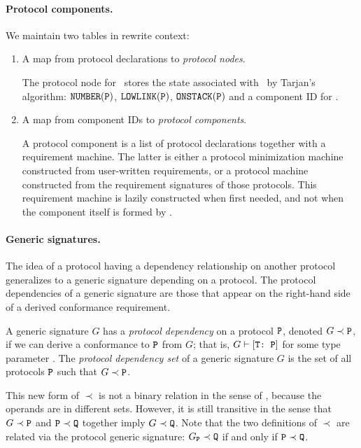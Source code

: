 \documentclass[../generics]{subfiles}
\begin{document}
\paragraph{Protocol components.} We maintain two tables in rewrite context:
\begin{enumerate}
\item A map from protocol declarations to \emph{protocol nodes}.

The protocol node for \tP\ stores the state associated with \tP\ by Tarjan's algorithm: $\texttt{NUMBER}(\texttt{P})$, $\texttt{LOWLINK}(\texttt{P})$, $\texttt{ONSTACK}(\texttt{P})$ and a component ID for \tP.
\item A map from component IDs to \emph{protocol components}.

A protocol component is a list of protocol declarations together with a requirement machine. The latter is either a protocol minimization machine constructed from user-written requirements, or a protocol machine constructed from the requirement signatures of those protocols. This requirement machine is lazily constructed when first needed, and not when the component itself is formed by .
\end{enumerate}

\paragraph{Generic signatures.}
The idea of a protocol having a dependency relationship on another protocol generalizes to a generic signature depending on a protocol. The protocol dependencies of a generic signature are those that appear on the right-hand side of a derived conformance requirement.

\begin{definition}
A generic signature $G$ has a \emph{protocol dependency} on a protocol $\texttt{P}$, denoted \index{$\prec$}$G\prec\texttt{P}$, if we can derive a conformance to $\texttt{P}$ from $G$; that is, $G\vdash[\texttt{T:~P}]$ for some type parameter \tT. The \emph{protocol dependency set} of a generic signature $G$ is the set of all protocols $\texttt{P}$ such that $G\prec\texttt{P}$.

\end{definition}

This new form of $\prec$ is not a binary relation in the sense of , because the operands are in different sets. However, it is still transitive in the sense that $G\prec\texttt{P}$ and $\texttt{P}\prec\texttt{Q}$ together imply $G\prec\texttt{Q}$. Note that the two definitions of $\prec$ are related via the protocol generic signature: $G_{\texttt{P}}\prec\texttt{Q}$ if and only if $\texttt{P}\prec\texttt{Q}$.
\end{document}
